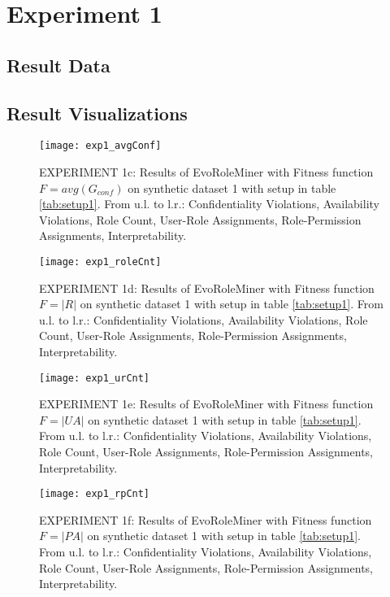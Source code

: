\newpage
\section{Experiment 1}
\label{sec:A_Exp1}
	\subsection{Result Data}
	\label{sec:A_Exp1_Data}
	\subsection{Result Visualizations}
	\label{sec:A_Exp1_Diagrams}
		\begin{figure}[H]
			\centering
		    \texttt{[image: exp1\_avgConf]}
		    \caption{EXPERIMENT 1c: Results of EvoRoleMiner with Fitness function $F=avg(G_{conf})$ on synthetic dataset 1 with setup in table \ref{tab:setup1}. From u.l. to l.r.: Confidentiality Violations, Availability Violations, Role Count, User-Role Assignments, Role-Permission Assignments, Interpretability.}
		    \label{fig:exp1_avgConf}
		\end{figure}
		
		\begin{figure}[H]
			\centering
		    \texttt{[image: exp1\_roleCnt]}
		    \caption{EXPERIMENT 1d: Results of EvoRoleMiner with Fitness function $F=|R|$ on synthetic dataset 1 with setup in table \ref{tab:setup1}. From u.l. to l.r.: Confidentiality Violations, Availability Violations, Role Count, User-Role Assignments, Role-Permission Assignments, Interpretability.}
		    \label{fig:exp1_roleCnt}
		\end{figure}
		
		\begin{figure}[H]
			\centering
		    \texttt{[image: exp1\_urCnt]}
		    \caption{EXPERIMENT 1e: Results of EvoRoleMiner with Fitness function $F=|UA|$ on synthetic dataset 1 with setup in table \ref{tab:setup1}. From u.l. to l.r.: Confidentiality Violations, Availability Violations, Role Count, User-Role Assignments, Role-Permission Assignments, Interpretability.}
		    \label{fig:exp1_urCnt}
		\end{figure}
		
		\begin{figure}[H]
		    \centering
		    \texttt{[image: exp1\_rpCnt]}
	    	\caption{EXPERIMENT 1f: Results of EvoRoleMiner with Fitness function $F=|PA|$ on synthetic dataset 1 with setup in table \ref{tab:setup1}. From u.l. to l.r.: Confidentiality Violations, Availability Violations, Role Count, User-Role Assignments, Role-Permission Assignments, Interpretability.}
	    	\label{fig:exp1_rpCnt}
	    \end{figure}
	
